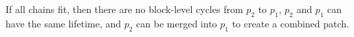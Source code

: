 \documentclass[9pt,twocolumn,letterpaper]{article}
\newcommand{\patch}{patch}
\newcommand{\nrb}{hard}
\newcommand{\todo}[1]{\footnote{\textbf{TODO}: #1}}
\begin{document}
\begin{comment}
%
It checks that every path starting at $p_1$ fits at least one of the
following cases:


%
% 
%

\begin{xcompactitemize}
\item $p_1 \PDDepend p_2$.
\item $p_1 \PDDepend h$, where $h$ is the \nrb\ \patch\ on $\PBlock{p_1}$.
\item $p_1 \PDDepend q$, where $q \not\in \PMem$.
\item $p_1 \PDDepend q$, where $p_2 \PDDepend q$.
\item $p_1 \PDDepend q$, where $\PDepset{q} \subseteq \PDepset{p_2}$
  and $|\PDepset{q}| \leq 2$.
\item Has length at most 10, traverses no node with more than 10
  direct dependencies, and does not traverse $p_2$.\todo{Yuck\ldots}
\end{xcompactitemize}

\noindent
\end{comment}
%
If all chains fit, then there are no block-level cycles from $p_2$
to $p_1$, $p_2$ and $p_1$ can have the same lifetime, and $p_2$ can be
merged into $p_1$ to create a combined patch.
\end{document}
